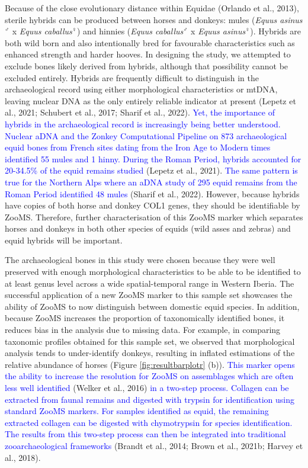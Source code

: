 \documentclass[preprint, 3p, authoryear]{elsarticle} %
\begin{document}
Because of the close evolutionary distance within Equidae (Orlando et al., 2013), sterile hybrids can be produced between horses and donkeys: mules (\emph{Equus asinus}\(^{\male}\) x \emph{Equus caballus}\(^{\female}\)) and hinnies (\emph{Equus caballus}\(^{\male}\) x \emph{Equus asinus}\(^{\female}\)). Hybrids are both wild born and also intentionally bred for favourable characteristics such as enhanced strength and harder hooves. In designing the study, we attempted to exclude bones likely derived from hybrids, although that possibility cannot be excluded entirely. Hybrids are frequently difficult to distinguish in the archaeological record using either morphological characteristics or mtDNA, leaving nuclear DNA as the only entirely reliable indicator at present (Lepetz et al., 2021; Schubert et al., 2017; Sharif et al., 2022). \textcolor{blue}{Yet, the importance of hybrids in the archaeological record is increasingly being better understood. Nuclear aDNA and the Zonkey Computational Pipeline on 873 archaeological equid bones from French sites dating from the Iron Age to Modern times identified 55 mules and 1 hinny. During the Roman Period, hybrids accounted for 20-34.5\% of the equid remains studied} (Lepetz et al., 2021). \textcolor{blue}{The same pattern is true for the Northern Alps where an aDNA study of 295 equid remains from the Roman Period identified 48 mules} (Sharif et al., 2022). However, because hybrids have copies of both horse and donkey COL1 genes, they should be identifiable by ZooMS. Therefore, further characterisation of this ZooMS marker which separates horses and donkeys in both other species of equids (wild asses and zebras) and equid hybrids will be important.

The archaeological bones in this study were chosen because they were well preserved with enough morphological characteristics to be able to be identified to at least genus level across a wide spatial-temporal range in Western Iberia. The successful application of a new ZooMS marker to this sample set showcases the ability of ZooMS to now distinguish between domestic equid species. In addition, because ZooMS increases the proportion of taxonomically identified bones, it reduces bias in the analysis due to missing data. For example, in comparing taxonomic profiles obtained for this sample set, we observed that morphological analysis tends to under-identify donkeys, resulting in inflated estimations of the relative abundance of horses (Figure \ref{fig:resultbarplotr} (b)). \textcolor{blue}{This marker opens the ability to increase the resolution for ZooMS on assemblages which are often less well identified} (Welker et al., 2016) \textcolor{blue}{in a two-step process. Collagen can be extracted from faunal remains and digested with trypsin for identification using standard ZooMS markers. For samples identified as equid, the remaining extracted collagen can be digested with chymotrypsin for species identification. The results from this two-step process can then be integrated into traditional zooarchaeological frameworks} (Brandt et al., 2014; Brown et al., 2021b; Harvey et al., 2018).
\end{document}
